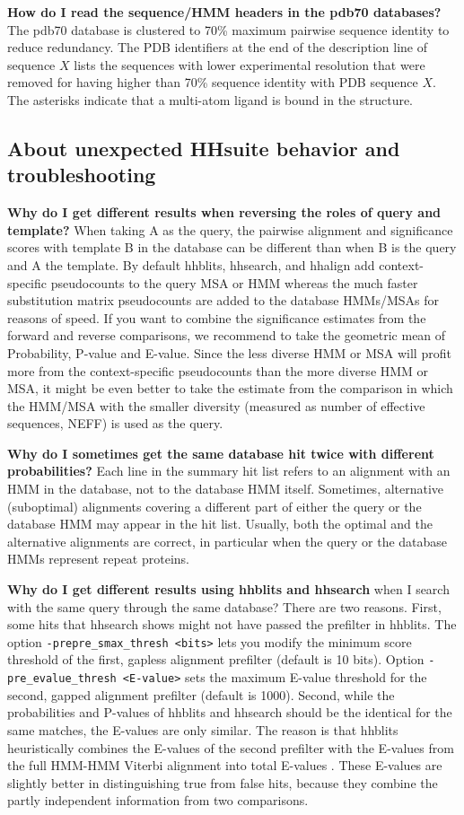 \documentclass[11pt,a4paper]{article}
\begin{document}
{\bf How do I read the sequence/HMM headers in the pdb70 databases?}
The pdb70 database is clustered to 70\% maximum pairwise sequence identity to reduce redundancy. The PDB identifiers at the end of the description line of sequence $X$ lists the sequences with lower experimental resolution that were removed for having higher than 70\% sequence identity with PDB sequence $X$. The asterisks indicate that a multi-atom ligand is bound in the structure. 


\subsection{About unexpected HHsuite behavior and troubleshooting}

{\bf Why do I get different results when reversing the roles of query and template?} When taking A as the query, the pairwise alignment and significance scores with template B in the database can be different than when B is the query and A the template. By default hhblits, hhsearch, and hhalign add context-specific pseudocounts to the query MSA or HMM whereas the much faster substitution matrix pseudocounts are added to the database HMMs/MSAs for reasons of speed. If you want to combine the significance estimates from the forward and reverse comparisons, we recommend to take the geometric mean of Probability, P-value and E-value. Since the less diverse HMM or MSA will profit more from the context-specific pseudocounts than the more diverse HMM or MSA, it might be even better to take the estimate from the comparison in which the HMM/MSA with the smaller diversity (measured as number of effective sequences, NEFF) is used as the query. 

{\bf Why do I sometimes get the same database hit twice with different probabilities?} Each line in the summary hit list refers to an alignment with an HMM in the database, not to the database HMM itself. Sometimes, alternative (suboptimal) alignments covering a different part of either the query or the database HMM may appear in the hit list. Usually, both the optimal and the alternative alignments are correct, in particular when the query or the database HMMs represent repeat proteins. 

{\bf Why do I get different results using hhblits and hhsearch} when I search with the same query through the same database? There are two reasons. First, some hits that hhsearch shows might not have passed the prefilter in hhblits. The option \verb`-prepre_smax_thresh <bits>` lets you modify the minimum score threshold of the first, gapless alignment prefilter (default is 10 bits). Option \verb`-pre_evalue_thresh <E-value>` sets the maximum E-value threshold for the second, gapped alignment prefilter (default is 1000). Second, while the probabilities and P-values of hhblits and hhsearch should be the identical for the same matches, the E-values are only similar. The reason is that hhblits heuristically combines the E-values of the second prefilter with the E-values from the full HMM-HMM Viterbi alignment into total E-values \cite{Remmert:2011}. These E-values are slightly better in distinguishing true from false hits, because they combine the partly independent information from two comparisons.
\end{document}
